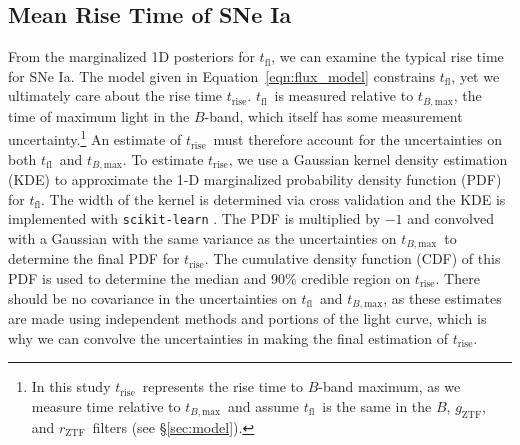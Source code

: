 \documentclass[twocolumn]{./aastex63}
\newcommand{\rztf}{$r_\mathrm{ZTF}$}
\newcommand{\gztf}{$g_\mathrm{ZTF}$}
\newcommand{\tfl}{$t_\mathrm{fl}$}
\newcommand{\trise}{$t_\mathrm{rise}$}
\newcommand{\tbmax}{$t_{B,\mathrm{max}}$}
\begin{document}
\subsection{Mean Rise Time of SNe Ia}\label{sec:mean_rise}

From the marginalized 1D posteriors for \tfl, we can examine the typical rise
time for SNe Ia. The model given in Equation~\ref{eqn:flux_model} constrains
\tfl, yet we ultimately care about the rise time \trise. \tfl\ is measured
relative to \tbmax, the time of maximum light in the $B$-band, which itself
has some measurement uncertainty.\footnote{In this study \trise\ represents
the rise time to $B$-band maximum, as we measure time relative to \tbmax\ and
assume \tfl\ is the same in the $B$, \gztf, and \rztf\ filters (see
\S\ref{sec:model}).} An estimate of \trise\ must therefore account for the
uncertainties on both \tfl\ and \tbmax. To estimate \trise, we use a Gaussian
kernel density estimation (KDE) to approximate the 1-D marginalized
probability density function (PDF) for \tfl. The width of the kernel is
determined via cross validation and the KDE is implemented with
\texttt{scikit-learn} \citep{Pedregosa11}. The PDF is multiplied by $-1$ and
convolved with a Gaussian with the same variance as the uncertainties on
\tbmax\ to determine the final PDF for \trise. The cumulative density function
(CDF) of this PDF is used to determine the median and 90\% credible region on
\trise. There should be no covariance in the uncertainties on \tfl\ and
\tbmax, as these estimates are made using independent methods and portions of
the light curve, which is why we can convolve the uncertainties in making the
final estimation of \trise.
\end{document}
